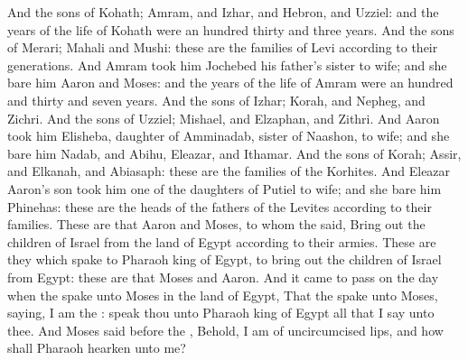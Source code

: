 \begin{biblechapter}
\verse And the sons of Kohath; Amram, and Izhar, and Hebron, and Uzziel: and the years of the life of Kohath were an hundred thirty and three years.
\verse And the sons of Merari; Mahali and Mushi: these are the families of Levi according to their generations.
\verse And Amram took him Jochebed his father's sister to wife; and she bare him Aaron and Moses: and the years of the life of Amram were an hundred and thirty and seven years.
\verse And the sons of Izhar; Korah, and Nepheg, and Zichri.
\verse And the sons of Uzziel; Mishael, and Elzaphan, and Zithri.
\verse And Aaron took him Elisheba, daughter of Amminadab, sister of Naashon, to wife; and she bare him Nadab, and Abihu, Eleazar, and Ithamar.
\verse And the sons of Korah; Assir, and Elkanah, and Abiasaph: these are the families of the Korhites.
\verse And Eleazar Aaron's son took him one of the daughters of Putiel to wife; and she bare him Phinehas: these are the heads of the fathers of the Levites according to their families.
\verse These are that Aaron and Moses, to whom the \LORD said, Bring out the children of Israel from the land of Egypt according to their armies.
\verse These are they which spake to Pharaoh king of Egypt, to bring out the children of Israel from Egypt: these are that Moses and Aaron.
 And it came to pass on the day when the \LORD spake unto Moses in the land of Egypt,
\verse That the \LORD spake unto Moses, saying, I am the \LORD: speak thou unto Pharaoh king of Egypt all that I say unto thee.
\verse And Moses said before the \LORD, Behold, I am of uncircumcised lips, and how shall Pharaoh hearken unto me?
\end{biblechapter}

